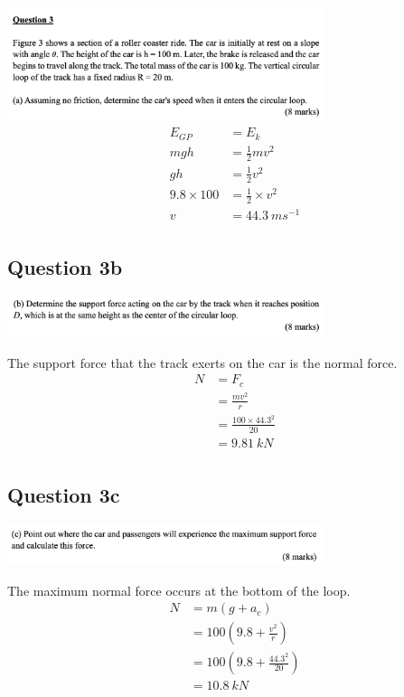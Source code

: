 \documentclass{article}
\begin{document}
\includegraphics[width=0.7\textwidth]{img/A4Q3a.jpg}
\begin{align*}
    E_{GP}       & = E_k               \\
    mgh          & = \frac{1}{2}mv^2   \\
    gh           & = \frac12v^2        \\
    9.8\times100 & = \frac12\times v^2 \\
    v            & = 44.3\ ms^{-1}     \\
\end{align*}
\subsection*{Question 3b}
\includegraphics[width=0.7\textwidth]{img/A4Q3b.jpg}

The support force that the track exerts on the car is the normal force.
\begin{align*}
    N & = F_c                        \\
      & = \frac{mv^2}{r}             \\
      & = \frac{100\times44.3^2}{20} \\
      & = 9.81\ kN                   \\
\end{align*}
\subsection*{Question 3c}
\includegraphics[width=0.7\textwidth]{img/A4Q3c.jpg}

The maximum normal force occurs at the bottom of the loop.
\begin{align*}
    N & = m(g + a_c)                   \\
      & = 100(9.8 + \frac{v^2}{r})     \\
      & = 100(9.8 + \frac{44.3^2}{20}) \\
      & = 10.8\ kN                     \\
\end{align*}
\end{document}
